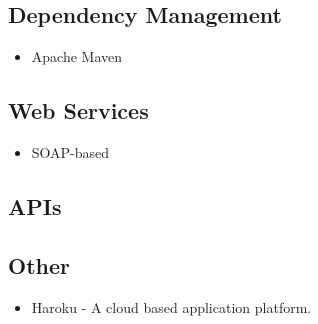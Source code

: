 \subsection{Dependency Management}
\begin{itemize}
	\item Apache Maven
\end{itemize}

\subsection{Web Services}
\begin{itemize}
	\item SOAP-based
\end{itemize} 

\subsection{APIs}
\subsection{Other}
\begin{itemize}
	\item Haroku - A cloud based application platform.
\end{itemize}





